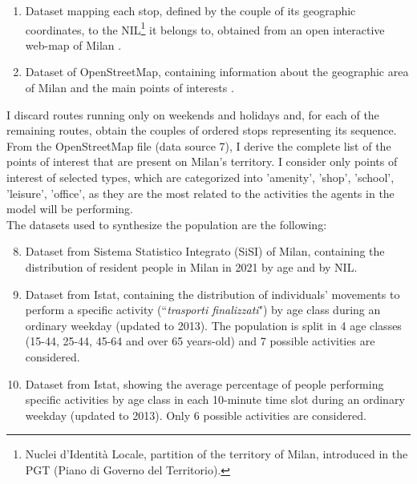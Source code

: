 \begin{enumerate}
    \item Dataset mapping each stop, defined by the couple of its geographic coordinates, to the NIL\footnote{Nuclei d'Identità Locale, partition of the territory of Milan, introduced in the PGT (Piano di Governo del Territorio).} it belongs to, obtained from an open interactive web-map of Milan \cite{site22}.
    \item Dataset of OpenStreetMap, containing information about the geographic area of Milan and the main points of interests \cite{site9}.
\end{enumerate} 
I discard routes running only on weekends and holidays and, for each of the remaining routes, obtain the couples of ordered stops representing its sequence. From the OpenStreetMap file (data source 7), I derive the complete list of the points of interest that are present on Milan's territory. I consider only points of interest of selected types, which are categorized into 'amenity', 'shop', 'school', 'leisure', 'office', as they are the most related to the activities the agents in the model will be performing. \\
The datasets used to synthesize the population are the following:
\begin{enumerate}
\setcounter{enumi}{7}
    \item Dataset \cite{site18} from Sistema Statistico Integrato (SiSI) of Milan, containing the distribution of resident people in Milan in 2021 by age and by NIL.
    \item Dataset \cite{site10} from Istat, containing the distribution of individuals' movements to perform a specific activity (``\textit{trasporti finalizzati}") by age class during an ordinary weekday (updated to 2013). The population is split in 4 age classes (15-44, 25-44, 45-64 and over 65 years-old) and 7 possible activities are considered.
    \item Dataset \cite{site11} from Istat, showing the average percentage of people performing specific activities by age class in each 10-minute time slot during an ordinary weekday (updated to 2013). Only 6 possible activities are considered.
\end{enumerate}
